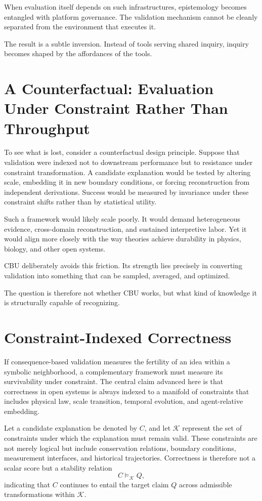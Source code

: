 \documentclass[12pt]{article}
\begin{document}
When evaluation itself depends on such infrastructures, epistemology becomes entangled with platform governance. The validation mechanism cannot be cleanly separated from the environment that executes it.

The result is a subtle inversion. Instead of tools serving shared inquiry, inquiry becomes shaped by the affordances of the tools.

\section{A Counterfactual: Evaluation Under Constraint Rather Than Throughput}

To see what is lost, consider a counterfactual design principle. Suppose that validation were indexed not to downstream performance but to resistance under constraint transformation. A candidate explanation would be tested by altering scale, embedding it in new boundary conditions, or forcing reconstruction from independent derivations. Success would be measured by invariance under these constraint shifts rather than by statistical utility.

Such a framework would likely scale poorly. It would demand heterogeneous evidence, cross-domain reconstruction, and sustained interpretive labor. Yet it would align more closely with the way theories achieve durability in physics, biology, and other open systems.

CBU deliberately avoids this friction. Its strength lies precisely in converting validation into something that can be sampled, averaged, and optimized.

The question is therefore not whether CBU works, but what kind of knowledge it is structurally capable of recognizing.

\section{Constraint-Indexed Correctness}

If consequence-based validation measures the fertility of an idea within a symbolic neighborhood, a complementary framework must measure its survivability under constraint. The central claim advanced here is that correctness in open systems is always indexed to a manifold of constraints that includes physical law, scale transition, temporal evolution, and agent-relative embedding.

Let a candidate explanation be denoted by \(C\), and let \(\mathcal{K}\) represent the set of constraints under which the explanation must remain valid. These constraints are not merely logical but include conservation relations, boundary conditions, measurement interfaces, and historical trajectories. Correctness is therefore not a scalar score but a stability relation
\[
C \models_{\mathcal{K}} Q,
\]
indicating that \(C\) continues to entail the target claim \(Q\) across admissible transformations within \(\mathcal{K}\).
\end{document}
